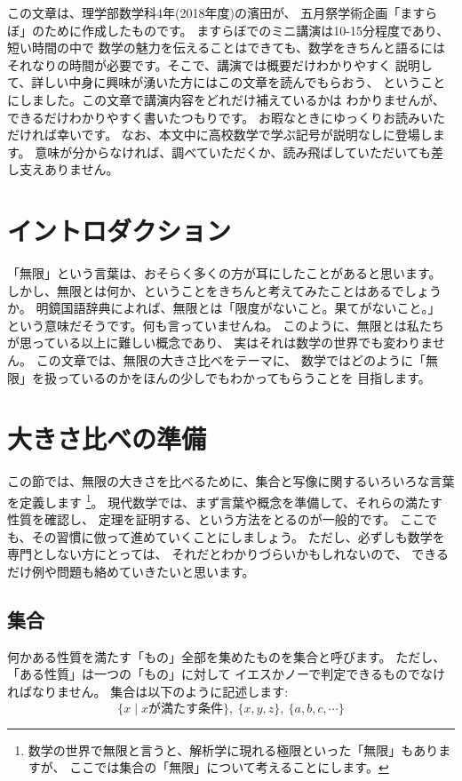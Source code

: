 \documentclass[./main]{subfiles} %
\theoremstyle{definition}
\begin{document}

この文章は、理学部数学科4年(2018年度)の濱田が、
五月祭学術企画「ますらぼ」のために作成したものです。
ますらぼでのミニ講演は10-15分程度であり、短い時間の中で
数学の魅力を伝えることはできても、数学をきちんと語るには
それなりの時間が必要です。そこで、講演では概要だけわかりやすく
説明して、詳しい中身に興味が湧いた方にはこの文章を読んでもらおう、
ということにしました。この文章で講演内容をどれだけ補えているかは
わかりませんが、できるだけわかりやすく書いたつもりです。
お暇なときにゆっくりお読みいただければ幸いです。
なお、本文中に高校数学で学ぶ記号が説明なしに登場します。
意味が分からなければ、調べていただくか、読み飛ばしていただいても差し支えありません。

\section{イントロダクション}
「無限」という言葉は、おそらく多くの方が耳にしたことがあると思います。
しかし、無限とは何か、ということをきちんと考えてみたことはあるでしょうか。
明鏡国語辞典によれば、無限とは「限度がないこと。果てがないこと。」
という意味だそうです。何も言っていませんね。
このように、無限とは私たちが思っている以上に難しい概念であり、
実はそれは数学の世界でも変わりません。
この文章では、無限の大きさ比べをテーマに、
数学ではどのように「無限」を扱っているのかをほんの少しでもわかってもらうことを
目指します。

\section{大きさ比べの準備}
この節では、無限の大きさを比べるために、集合と写像に関するいろいろな言葉を定義します
\footnote{数学の世界で無限と言うと、解析学に現れる極限といった「無限」もありますが、
ここでは集合の「無限」について考えることにします。}。
現代数学では、まず言葉や概念を準備して、それらの満たす性質を確認し、
定理を証明する、という方法をとるのが一般的です。
ここでも、その習慣に倣って進めていくことにしましょう。
ただし、必ずしも数学を専門としない方にとっては、
それだとわかりづらいかもしれないので、
できるだけ例や問題も絡めていきたいと思います。

\subsection{集合}
何かある性質を満たす「もの」全部を集めたものを集合と呼びます。
ただし、「ある性質」は一つの「もの」に対して
イエスかノーで判定できるものでなければなりません。
集合は以下のように記述します:
\[
\{x\mid xが満たす条件\},\ \{x,y,z\},\ \{a,b,c,\cdots\}
\]
\end{document}
